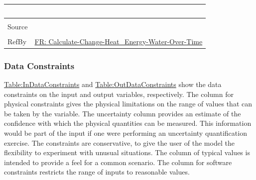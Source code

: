 \documentclass[12pt]{article}
\begin{document}
\begin{minipage}{\textwidth}
\begin{tabular}{>{\raggedright}p{}>{\raggedright\arraybackslash}p{}}
$$\\ \midrule \\
Source & \cite{koothoor2013}
\\ \midrule \\
RefBy & \hyperref[calcChgHeatEnergyWtrOverTime]{FR: Calculate-Change-Heat\_Energy-Water-Over-Time}
\\ \bottomrule \end{tabular}
\end{minipage}
\subsubsection{Data Constraints}
\label{Sec:DataConstraints}
\hyperref[Table:InDataConstraints]{Table:InDataConstraints} and \hyperref[Table:OutDataConstraints]{Table:OutDataConstraints} show the data constraints on the input and output variables, respectively. The column for physical constraints gives the physical limitations on the range of values that can be taken by the variable. The uncertainty column provides an estimate of the confidence with which the physical quantities can be measured. This information would be part of the input if one were performing an uncertainty quantification exercise. The constraints are conservative, to give the user of the model the flexibility to experiment with unusual situations. The column of typical values is intended to provide a feel for a common scenario. The column for software constraints restricts the range of inputs to reasonable values.
\end{document}
